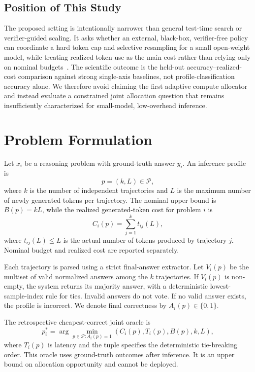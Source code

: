 \documentclass[runningheads]{llncs}
\begin{document}
\subsection{Position of This Study}

The proposed setting is intentionally narrower than general test-time search
or verifier-guided scaling. It asks whether an external, black-box,
verifier-free policy can coordinate a hard token cap and selective resampling
for a small open-weight model, while treating realized token use as the main
cost rather than relying only on nominal budgets~\cite{wang2024tokeneconomies}.
The scientific outcome is the held-out
accuracy--realized-cost comparison against strong single-axis baselines, not
profile-classification accuracy alone. We therefore avoid claiming the first
adaptive compute allocator and instead evaluate a constrained joint allocation
question that remains insufficiently characterized for small-model,
low-overhead inference.

\section{Problem Formulation}

Let $x_i$ be a reasoning problem with ground-truth answer $y_i$. An inference
profile is
\begin{equation}
  p=(k,L)\in\mathcal{P},
\end{equation}
where $k$ is the number of independent trajectories and $L$ is the maximum
number of newly generated tokens per trajectory. The nominal upper bound is
$B(p)=kL$, while the realized generated-token cost for problem $i$ is
\begin{equation}
  C_i(p)=\sum_{j=1}^{k} t_{ij}(L),
\end{equation}
where $t_{ij}(L)\leq L$ is the actual number of tokens produced by trajectory
$j$. Nominal budget and realized cost are reported separately.

Each trajectory is parsed using a strict final-answer extractor. Let
$V_i(p)$ be the multiset of valid normalized answers among the $k$
trajectories. If $V_i(p)$ is non-empty, the system returns its majority answer,
with a deterministic lowest-sample-index rule for ties. Invalid answers do not
vote. If no valid answer exists, the profile is incorrect. We denote final
correctness by $A_i(p)\in\{0,1\}$.

The retrospective cheapest-correct joint oracle is
\begin{equation}
  p_i^{*}=\arg\min_{p\in\mathcal{P}:A_i(p)=1}
  \left(C_i(p),T_i(p),B(p),k,L\right),
\end{equation}
where $T_i(p)$ is latency and the tuple specifies the deterministic
tie-breaking order. This oracle uses ground-truth outcomes after inference. It
is an upper bound on allocation opportunity and cannot be deployed.
\end{document}

